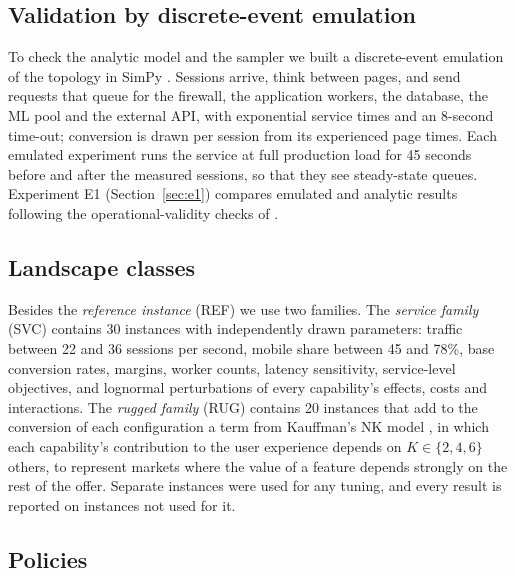 \documentclass[preprint,12pt,authoryear]{elsarticle}
\theoremstyle{definition}
\begin{document}
\subsection{Validation by discrete-event emulation}

To check the analytic model and the sampler we built a discrete-event emulation of the topology in SimPy \citep{simpy2023}. Sessions arrive, think between pages, and send requests that queue for the firewall, the application workers, the database, the ML pool and the external API, with exponential service times and an 8-second time-out; conversion is drawn per session from its experienced page times. Each emulated experiment runs the service at full production load for 45 seconds before and after the measured sessions, so that they see steady-state queues. Experiment E1 (Section~\ref{sec:e1}) compares emulated and analytic results following the operational-validity checks of \citet{sargent2013}.

\subsection{Landscape classes}

Besides the \emph{reference instance} (REF) we use two families. The \emph{service family} (SVC) contains 30 instances with independently drawn parameters: traffic between 22 and 36 sessions per second, mobile share between 45 and 78\%, base conversion rates, margins, worker counts, latency sensitivity, service-level objectives, and lognormal perturbations of every capability's effects, costs and interactions. The \emph{rugged family} (RUG) contains 20 instances that add to the conversion of each configuration a term from Kauffman's NK model \citep{kauffman1993}, in which each capability's contribution to the user experience depends on $K\in\{2,4,6\}$ others, to represent markets where the value of a feature depends strongly on the rest of the offer. Separate instances were used for any tuning, and every result is reported on instances not used for it.

\subsection{Policies}
\end{document}
